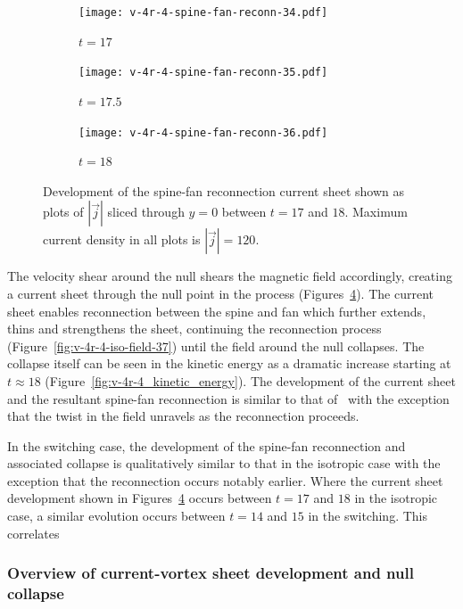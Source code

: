 \begin{figure}[t]
  \centering
    \begin{subfigure}{0.32\textwidth}
      \texttt{[image: v-4r-4-spine-fan-reconn-34.pdf]}
      \caption{$t=17$}
      \label{fig:v-4r-4-spine-fan-reconn-34}
    \end{subfigure}
    \hfill
    \begin{subfigure}{0.32\textwidth}
      \texttt{[image: v-4r-4-spine-fan-reconn-35.pdf]}
      \caption{$t=17.5$}
      \label{fig:v-4r-4-spine-fan-reconn-35}
    \end{subfigure}
    \hfill
    \begin{subfigure}{0.32\textwidth}
      \texttt{[image: v-4r-4-spine-fan-reconn-36.pdf]}
      \caption{$t=18$}
      \label{fig:v-4r-4-spine-fan-reconn-36}
    \end{subfigure}
\caption{Development of the spine-fan reconnection current sheet shown as plots of $|\vec{j}|$ sliced through $y=0$ between $t=17$ and $18$. Maximum current density in all plots is $|\vec{j}| = 120$.}
\label{fig:spine_fan_reconnection_current_sheet}
\end{figure}

The velocity shear around the null shears the magnetic field accordingly, creating a current sheet through the null point in the process (Figures~\ref{fig:spine_fan_reconnection_current_sheet}). The current sheet enables reconnection between the spine and fan which further extends, thins and strengthens the sheet, continuing the reconnection process (Figure~\ref{fig:v-4r-4-iso-field-37}) until the field around the null collapses. The collapse itself can be seen in the kinetic energy as a dramatic increase starting at $t\approx18$ (Figure~\ref{fig:v-4r-4_kinetic_energy}). The development of the current sheet and the resultant spine-fan reconnection is similar to that of~\cite{pontinCurrentSheetFormation2007} with the exception that the twist in the field unravels as the reconnection proceeds. 

In the switching case, the development of the spine-fan reconnection and associated collapse is qualitatively similar to that in the isotropic case with the exception that the reconnection occurs notably earlier. Where the current sheet development shown in Figures~\ref{fig:spine_fan_reconnection_current_sheet} occurs between $t=17$ and $18$ in the isotropic case, a similar evolution occurs between $t=14$ and $15$ in the switching. This correlates 

\subsubsection{Overview of current-vortex sheet development and null collapse}

